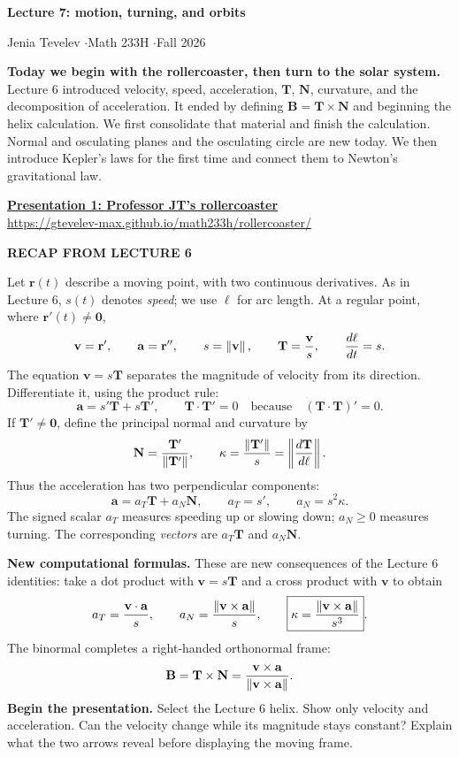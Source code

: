 \documentclass[11pt,letterpaper]{article}
\newcommand{\R}{\mathbf r}\newcommand{\V}{\mathbf v}\newcommand{\A}{\mathbf a}
\newcommand{\T}{\mathbf T}\newcommand{\N}{\mathbf N}\newcommand{\B}{\mathbf B}
\newcommand{\heading}[1]{\vspace{3pt}{\large\bfseries #1}\par}
\newcommand{\subhead}[1]{\textbf{#1}\quad}
\newcommand{\tagline}[1]{{\small\bfseries\color{inkblue}#1}\par}
\newcommand{\demolink}[2]{\href{#1}{\textcolor{inkblue}{\textbf{#2}}}\\[-2pt]{\small\url{#1}}\par}
\begin{document}
\providecommand{\startpage}{1}\setcounter{page}{\startpage}
{\LARGE\bfseries Lecture 7: motion, turning, and orbits}\par
Jenia Tevelev \enspace$\cdot$\enspace Math 233H \enspace$\cdot$\enspace Fall 2026

\textbf{Today we begin with the rollercoaster, then turn to the solar system.}
Lecture 6 introduced velocity, speed, acceleration, $\T$, $\N$, curvature, and the decomposition of acceleration. It ended by defining $\B=\T\times\N$ and beginning the helix calculation. We first consolidate that material and finish the calculation. Normal and osculating planes and the osculating circle are new today. We then introduce Kepler's laws for the first time and connect them to Newton's gravitational law.

\demolink{https://gtevelev-max.github.io/math233h/rollercoaster/}{Presentation 1: Professor JT's rollercoaster}

\tagline{RECAP FROM LECTURE 6}
\heading{Velocity, speed, and turning}
Let $\R(t)$ describe a moving point, with two continuous derivatives. As in Lecture 6, $s(t)$ denotes \emph{speed}; we use $\ell$ for arc length. At a regular point, where $\R'(t)\ne\mathbf0$,
\[
 \V=\R',\qquad \A=\R'',\qquad s=\norm{\V},\qquad
 \T=\frac{\V}{s},\qquad \frac{d\ell}{dt}=s.
\]
The equation $\V=s\T$ separates the magnitude of velocity from its direction. Differentiate it, using the product rule:
\[
 \A=s'\T+s\T',\qquad \T\cdot\T'=0
 \quad\text{because}\quad (\T\cdot\T)'=0.
\]
If $\T'\ne\mathbf0$, define the principal normal and curvature by
\[
 \N=\frac{\T'}{\norm{\T'}},\qquad
 \kappa=\frac{\norm{\T'}}{s}=\left\lVert\frac{d\T}{d\ell}\right\rVert.
\]
Thus the acceleration has two perpendicular components:
\[
 \boxed{\A=a_T\T+a_N\N,\qquad a_T=s',\qquad a_N=s^2\kappa.}
\]
The signed scalar $a_T$ measures speeding up or slowing down; $a_N\ge0$ measures turning. The corresponding \emph{vectors} are $a_T\T$ and $a_N\N$.

\subhead{New computational formulas.} These are new consequences of the Lecture 6 identities: take a dot product with $\V=s\T$ and a cross product with $\V$ to obtain
\[
 a_T=\frac{\V\cdot\A}{s},\qquad
 a_N=\frac{\norm{\V\times\A}}s,\qquad
 \boxed{\kappa=\frac{\norm{\V\times\A}}{s^3}}.
\]
The binormal completes a right-handed orthonormal frame:
\[
 \B=\T\times\N=\frac{\V\times\A}{\norm{\V\times\A}}.
\]
\subhead{Begin the presentation.} Select the Lecture 6 helix. Show only velocity and acceleration. Can the velocity change while its magnitude stays constant? Explain what the two arrows reveal before displaying the moving frame.
\end{document}
